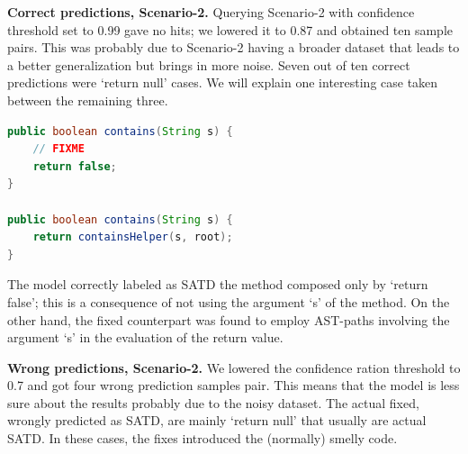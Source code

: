 %
% 
%
%

\textbf{Correct predictions, Scenario-2.}
 Querying Scenario-2 with confidence threshold set to 0.99 gave no hits; we lowered it to 0.87 and obtained ten sample pairs. This was probably due to Scenario-2 having a broader dataset that leads to a better generalization but brings in more noise. 
 Seven out of ten correct predictions were `return null' cases. We will explain one interesting case taken between the remaining three.


\begin{lstlisting}[caption={Scenario-2 correct predictions, verbatim source code}, label={lst:scenario_2_correct},language=Java]
public boolean contains(String s) {
    // FIXME
    return false;
}

public boolean contains(String s) {
    return containsHelper(s, root);
}
\end{lstlisting}

The model correctly labeled as SATD the method composed only by `return false'; this is a consequence of not using the argument `s' of the method. On the other hand, the fixed counterpart was found to employ AST-paths involving the argument `s' in the evaluation of the return value.

\textbf{Wrong predictions, Scenario-2.}
We lowered the confidence ration threshold to 0.7 and got four wrong prediction samples pair. This means that the model is less sure about the results probably due to the noisy dataset.
The actual fixed, wrongly predicted as SATD, are mainly `return null' that usually are actual SATD. In these cases, the fixes introduced the (normally) smelly code.